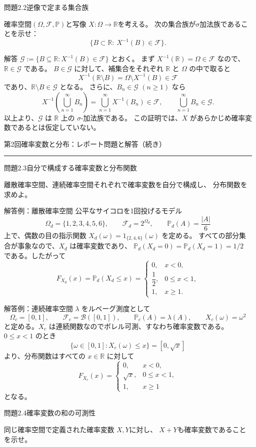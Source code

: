 \documentclass[a4paper,10pt,pdflatex,ja=standard,jafont=ipaex-type1,
  magstyle=real,scale=1]{bxjsarticle}
\newcommand{\topic}[1]{\par\vspace{5pt}
  {\large\sffamily\mdseries\color{accent}#1}\par\vspace{2pt}}
\newcommand{\handouttitle}[1]{%
  \begin{center}
    {\Large\sffamily\mdseries\color{ink}#1}\par\vspace{3mm}
    {\color{accent}\rule{0.88\linewidth}{0.7pt}}
  \end{center}\vspace{-2mm}}
\newcommand{\keybox}[1]{\par\vspace{3pt}\begingroup
  \setlength{\fboxsep}{5pt}
  \colorbox{soft}{\parbox{\dimexpr\linewidth-2\fboxsep\relax}{#1}}%
  \endgroup\par\vspace{2pt}}
\newcommand{\examplelabel}[1]{{\sffamily\mdseries\color{ink}#1}}
\newcommand{\F}{\mathcal F}
\newcommand{\R}{\mathbb R}
\newcommand{\Prob}{\mathbb P}
\newcommand{\ind}{\mathrm{1}}
\begin{document}
\topic{問題2.2\quad 逆像で定まる集合族}
\keybox{確率空間$(\Omega,\mathcal F,\mathbb P)$と写像 $X:\Omega\to\mathbb R$を考える。
次の集合族が$\sigma$加法族であることを示せ：
$$\{B\subset\mathbb R:\ X^{-1}(B)\in\mathcal F\}.$$}

\examplelabel{解答}
$\mathcal G:=\{B\subseteq\R:X^{-1}(B)\in\F\}$ とおく。
まず $X^{-1}(\R)=\Omega\in\F$ なので、$\R\in\mathcal G$ である。
$B\in\mathcal G$ に対して、補集合をそれぞれ $\R$ と $\Omega$ の中で取ると
$$
  X^{-1}(\R\setminus B)=\Omega\setminus X^{-1}(B)\in\F
$$
であり、$\R\setminus B\in\mathcal G$ となる。
さらに、$B_n\in\mathcal G$ $(n\ge1)$ なら
$$
  X^{-1}\!\left(\bigcup_{n=1}^{\infty}B_n\right)
  =\bigcup_{n=1}^{\infty}X^{-1}(B_n)\in\F,
  \qquad \bigcup_{n=1}^{\infty}B_n\in\mathcal G.
$$
以上より、$\mathcal G$ は $\R$ 上の $\sigma$-加法族である。
この証明では、$X$ があらかじめ確率変数であるとは仮定していない。

\clearpage
\handouttitle{第2回\quad 確率変数と分布：レポート問題と解答（続き）}

\topic{問題2.3\quad 自分で構成する確率変数と分布関数}
\keybox{離散確率空間、連続確率空間それぞれで確率変数を自分で構成し、
分布関数を求めよ。}

\examplelabel{解答例：離散確率空間}
公平なサイコロを1回投げるモデル
$$
  \Omega_d=\{1,2,3,4,5,6\},\qquad \F_d=2^{\Omega_d},\qquad
  \Prob_d(A)=\frac{|A|}{6}
$$
上で、偶数の目の指示関数 $X_d(\omega)=\ind_{\{2,4,6\}}(\omega)$ を定める。
すべての部分集合が事象なので、$X_d$ は確率変数であり、
$\Prob_d(X_d=0)=\Prob_d(X_d=1)=1/2$ である。したがって
$$
  F_{X_d}(x)=\Prob_d(X_d\le x)=
  \begin{cases}
    0,&x<0,\\
    \dfrac12,&0\le x<1,\\
    1,&x\ge1.
  \end{cases}
$$

\examplelabel{解答例：連続確率空間}
$\lambda$ をルベーグ測度として
$$
  \Omega_c=[0,1],\qquad \F_c=\mathcal B([0,1]),\qquad
  \Prob_c(A)=\lambda(A),\qquad X_c(\omega)=\omega^2
$$
と定める。$X_c$ は連続関数なのでボレル可測、すなわち確率変数である。
$0\le x<1$ のとき
$$
  \{\omega\in[0,1]:X_c(\omega)\le x\}=[0,\sqrt{x}]
$$
より、分布関数はすべての $x\in\R$ に対して
$$
  F_{X_c}(x)=
  \begin{cases}
    0,&x<0,\\
    \sqrt{x},&0\le x<1,\\
    1,&x\ge1
  \end{cases}
$$
となる。

\topic{問題2.4\quad 確率変数の和の可測性}
\keybox{同じ確率空間で定義された確率変数 $X,Y$に対し、
$X+Y$も確率変数であることを示せ。}
\end{document}
